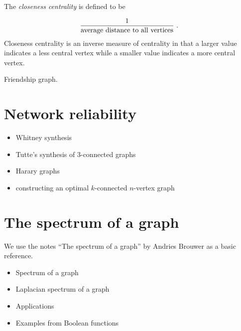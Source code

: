 The {\it closeness centrality} is defined to be

\[
       \frac{1}{{\rm average\ distance\ to\ all\ vertices}}\ .
\]
Closeness centrality is an inverse measure of centrality in that a
larger value indicates a less
central vertex while a smaller value indicates a more central vertex.

\begin{algorithm}[!htbp]

\caption{Friendship graph.}
\label{alg:distance_connectivity:friendship_graphs}
\end{algorithm}



\section{Network reliability}

\begin{itemize}
\item Whitney synthesis

\item Tutte's synthesis of $3$-connected graphs

\item Harary graphs

\item constructing an optimal $k$-connected $n$-vertex graph
\end{itemize}


\section{The spectrum of a graph}

We use the notes ``The spectrum of a graph'' by
Andries Brouwer \cite{Brouwer} as a basic reference.

\begin{itemize}

\item
Spectrum of a graph

\item
Laplacian spectrum of a graph

\item
Applications

\item
Examples from Boolean functions
\end{itemize}


